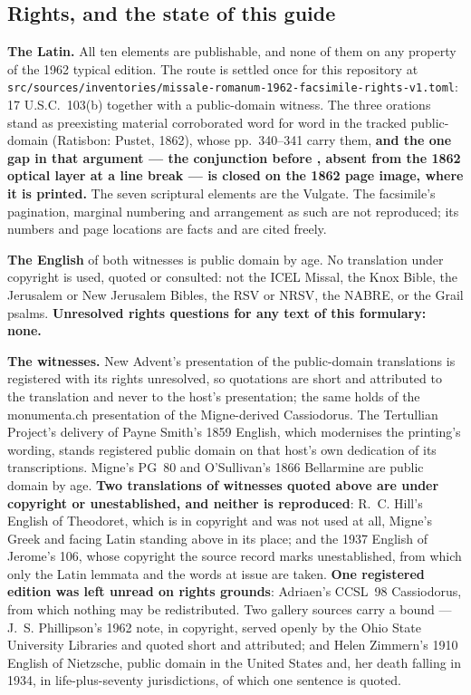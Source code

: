 \subsection*{Rights, and the state of this guide}

\textbf{The Latin.} All ten elements are publishable, and none of them on any
property of the 1962 typical edition. The route is settled once for this
repository at
\texttt{src/sources/inventories/missale-\allowbreak romanum-1962-facsimile-rights-v1.toml}:
17 U.S.C.~103(b) together with a public-domain witness. The three orations stand
as preexisting material corroborated word for word in the tracked public-domain
 (Ratisbon: Pustet, 1862), whose pp.~340--341 carry them,
\textbf{and the one gap in that argument --- the conjunction  before
, absent from the 1862 optical layer at a line break --- is closed
on the 1862 page image, where it is printed.} The seven scriptural elements are
the Vulgate. The facsimile's pagination, marginal numbering and arrangement as
such are not reproduced; its numbers and page locations are facts and are cited
freely.

\textbf{The English} of both witnesses is public domain by age. No translation
under copyright is used, quoted or consulted: not the ICEL Missal, the Knox
Bible, the Jerusalem or New Jerusalem Bibles, the RSV or NRSV, the NABRE, or the
Grail psalms. \textbf{Unresolved rights questions for any text of this
formulary: none.}

\textbf{The witnesses.} New Advent's presentation of the public-domain
 translations is registered with its rights
unresolved, so quotations are short and attributed to the translation and never
to the host's presentation; the same holds of the monumenta.ch presentation of
the Migne-derived Cassiodorus. The Tertullian Project's delivery of Payne
Smith's 1859 English, which modernises the printing's wording, stands registered
public domain on that host's own dedication of its transcriptions. Migne's
PG~80 and O'Sullivan's 1866 Bellarmine are public domain by age.
\textbf{Two translations of witnesses quoted above are under copyright or
unestablished, and neither is reproduced}: R.~C. Hill's
English of Theodoret, which is in copyright and was not used at all, Migne's
Greek and facing Latin standing above in its place; and the 1937 English of
Jerome's  106, whose copyright the source record marks
unestablished, from which only the Latin lemmata and the words at issue are
taken. \textbf{One registered edition was left unread on rights grounds}:
Adriaen's CCSL~98 Cassiodorus, from which nothing may be redistributed. Two
gallery sources carry a bound --- J.~S. Phillipson's 1962 note, in copyright,
served openly by the Ohio State University Libraries and quoted short and
attributed; and Helen Zimmern's 1910 English of Nietzsche, public domain in the
United States and, her death falling in 1934, in life-plus-seventy
jurisdictions, of which one sentence is quoted.

